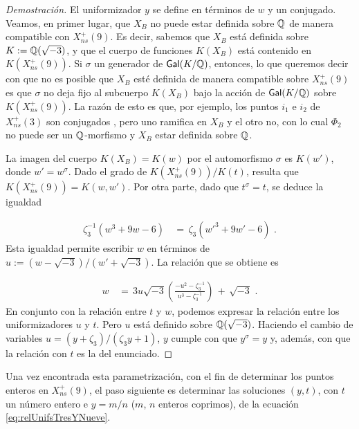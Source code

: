 \begin{proof}[Demostraci\'{o}n]
 El uniformizador $y$ se define en t\'{e}rminos de $w$ y un conjugado. Veamos,
 en primer lugar, que $X_{B}$ no puede estar definida sobre $\mathbb{Q}$ de manera
 compatible con $X_{ns}^{+}(9)$. Es decir, sabemos que $X_{B}$ est\'{a} definida
 sobre $K:=\mathbb{Q}(\sqrt{-3})$, y que el cuerpo de funciones $K(X_{B})$ est\'{a}
 contenido en $K(X_{ns}^{+}(9))$. Si $\sigma$ un generador de $\mathsf{Gal}(K/\mathbb{Q})$,
 entonces, lo que queremos decir con que no es posible que $X_{B}$ est\'{e}
 definida de manera compatible sobre $X_{ns}^{+}(9)$ es que $\sigma$ no deja fijo
 al subcuerpo $K(X_{B})$ bajo la acci\'{o}n de $\mathsf{Gal}(K/\mathbb{Q})$ sobre
 $K(X_{ns}^{+}(9))$. La raz\'{o}n de esto es que, por ejemplo, los puntos
 $i_{1}$ e $i_{2}$ de $X_{ns}^{+}(3)$ son conjugados%
 , pero uno ramifica en $X_{B}$ y el otro no, con lo cual $\Phi_{2}$ no puede
 ser un $\mathbb{Q}$-morfismo y $X_{B}$ estar definida sobre $\mathbb{Q}$.

 La imagen del cuerpo $K(X_{B})=K(w)$ por el automorfismo $\sigma$ es
 $K(w')$, donde $w'=w^{\sigma}$. Dado el grado de $K(X_{ns}^{+}(9))/K(t)$,
 resulta que $K(X_{ns}^{+}(9))=K(w,w')$. Por otra parte, dado que $t^{\sigma}=t$,
 se deduce la igualdad

 \begin{align*}
  \zeta_{3}^{-1}(w^{3}+9w-6)&\,=\,\zeta_{3}(w'^{3}+9w'-6)\text{ .}
 \end{align*}
Esta igualdad permite escribir $w$ en t\'{e}rminos de
$u:=(w-\sqrt{-3})/(w'+\sqrt{-3})$. La relaci\'{o}n que se obtiene es

\begin{align*}
 w & \,=\,3u\sqrt{-3}\left(
 \frac{-u^{2}-\zeta_{3}^{-1}}{u^{3}-\zeta_{3}^{-1}}\right)\,+\,\sqrt{-3}
 \text{ .}
\end{align*}
En conjunto con la relaci\'{o}n entre $t$ y $w$, podemos expresar la relaci\'{o}n
entre los uniformizadores $u$ y $t$. Pero $u$ est\'{a} definido sobre
$\mathbb{Q}(\sqrt{-3})$. Haciendo el cambio de variables
$u=(y+\zeta_{3})/(\zeta_{3}y+1)$, $y$ cumple con que $y^{\sigma}=y$ y, adem\'{a}s,
con que la relaci\'{o}n con $t$ es la del enunciado.
\end{proof}

Una vez encontrada esta parametrizaci\'{o}n, con el fin de determinar los puntos
enteros en $X_{ns}^{+}(9)$, el paso siguiente es determinar las soluciones
$(y,t)$, con $t$ un n\'{u}mero entero e $y=m/n$ ($m$, $n$ enteros coprimos), de la
ecuaci\'{o}n \ref{eq:relUnifsTresYNueve}.
%

